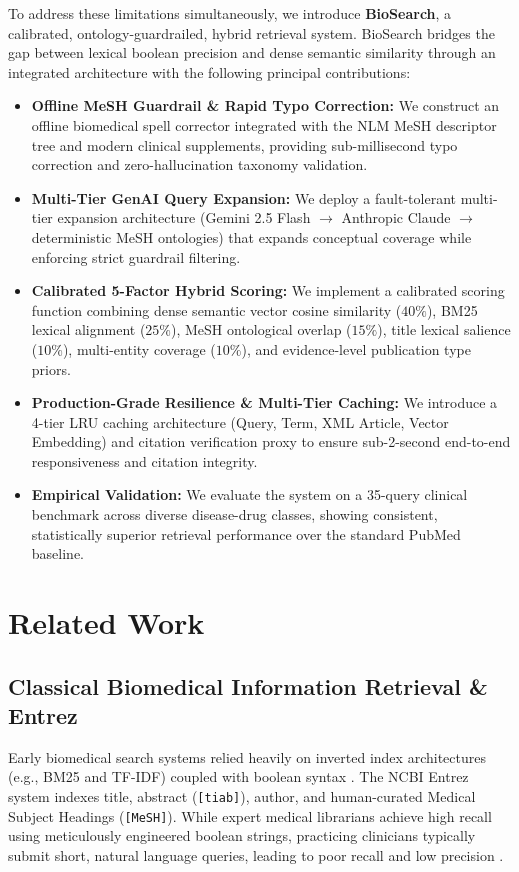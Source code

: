 \documentclass[conference]{IEEEtran}
\begin{document}
To address these limitations simultaneously, we introduce \textbf{BioSearch}, a calibrated, ontology-guardrailed, hybrid retrieval system. BioSearch bridges the gap between lexical boolean precision and dense semantic similarity through an integrated architecture with the following principal contributions:
\begin{itemize}
    \item \textbf{Offline MeSH Guardrail \& Rapid Typo Correction:} We construct an offline biomedical spell corrector integrated with the NLM MeSH descriptor tree and modern clinical supplements, providing sub-millisecond typo correction and zero-hallucination taxonomy validation.
    \item \textbf{Multi-Tier GenAI Query Expansion:} We deploy a fault-tolerant multi-tier expansion architecture (Gemini 2.5 Flash $\rightarrow$ Anthropic Claude $\rightarrow$ deterministic MeSH ontologies) that expands conceptual coverage while enforcing strict guardrail filtering.
    \item \textbf{Calibrated 5-Factor Hybrid Scoring:} We implement a calibrated scoring function combining dense semantic vector cosine similarity ($40\%$), BM25 lexical alignment ($25\%$), MeSH ontological overlap ($15\%$), title lexical salience ($10\%$), multi-entity coverage ($10\%$), and evidence-level publication type priors.
    \item \textbf{Production-Grade Resilience \& Multi-Tier Caching:} We introduce a 4-tier LRU caching architecture (Query, Term, XML Article, Vector Embedding) and citation verification proxy to ensure sub-2-second end-to-end responsiveness and citation integrity.
    \item \textbf{Empirical Validation:} We evaluate the system on a 35-query clinical benchmark across diverse disease-drug classes, showing consistent, statistically superior retrieval performance over the standard PubMed baseline.
\end{itemize}

\section{Related Work}

\subsection{Classical Biomedical Information Retrieval \& Entrez}
Early biomedical search systems relied heavily on inverted index architectures (e.g., BM25 and TF-IDF) coupled with boolean syntax \cite{sayers_entrez}. The NCBI Entrez system indexes title, abstract (\texttt{[tiab]}), author, and human-curated Medical Subject Headings (\texttt{[MeSH]}). While expert medical librarians achieve high recall using meticulously engineered boolean strings, practicing clinicians typically submit short, natural language queries, leading to poor recall and low precision \cite{lu_pubmed}.
\end{document}
